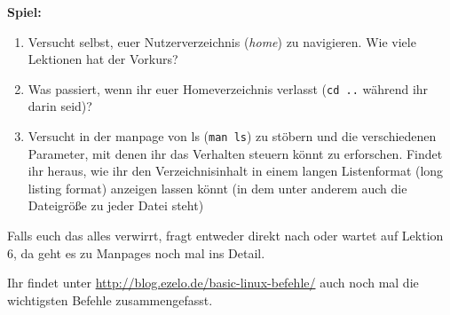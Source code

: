 \textbf{Spiel:}
\begin{enumerate}
    \item Versucht selbst, euer Nutzerverzeichnis (\emph{home}) zu navigieren.
        Wie viele Lektionen hat der Vorkurs?
    \item Was passiert, wenn ihr euer Homeverzeichnis verlasst (\texttt{cd ..}
        während ihr darin seid)?
	\item Versucht in der manpage von ls (\texttt{man ls}) zu stöbern und die
		verschiedenen Parameter, mit denen ihr das Verhalten steuern könnt zu
		erforschen. Findet ihr heraus, wie ihr den Verzeichnisinhalt in einem
		langen Listenformat (long listing format) anzeigen lassen könnt (in dem
		unter anderem auch die Dateigröße zu jeder Datei steht)
\end{enumerate}

\vspace{5em}

Falls euch das alles verwirrt, fragt entweder direkt nach oder wartet auf
Lektion 6, da geht es zu Manpages noch mal ins Detail.

Ihr findet unter \url{http://blog.ezelo.de/basic-linux-befehle/} auch noch mal
die wichtigsten Befehle zusammengefasst.
